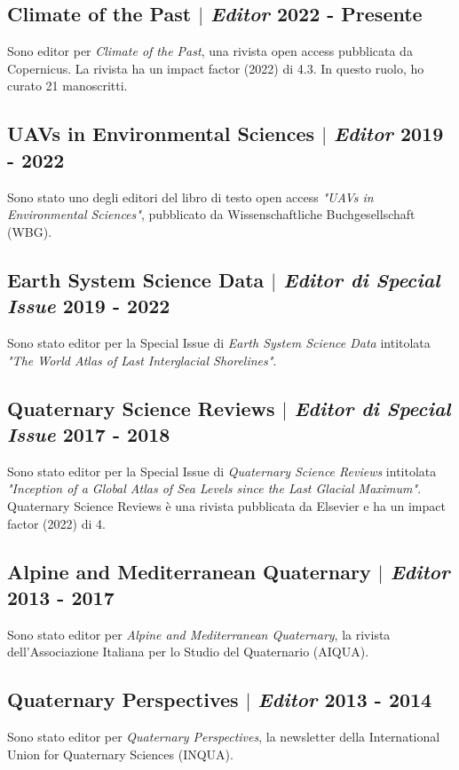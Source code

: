 \documentclass[11pt]{article}
\begin{document}
\subsection{Climate of the Past $|$ {\normalfont\textit{Editor}} \hfill 2022 - Presente}
{\footnotesize Sono editor per \textit{Climate of the Past}, una rivista open access pubblicata da Copernicus. La rivista ha un impact factor (2022) di 4.3. In questo ruolo, ho curato 21 manoscritti.}
\bigskip

\subsection{UAVs in Environmental Sciences $|$ {\normalfont\textit{Editor}} \hfill 2019 - 2022}
{\footnotesize Sono stato uno degli editori del libro di testo open access \textit{"UAVs in Environmental Sciences"}, pubblicato da Wissenschaftliche Buchgesellschaft (WBG).}
\bigskip

\subsection{Earth System Science Data $|$ {\normalfont\textit{Editor di Special Issue}} \hfill 2019 - 2022}
{\footnotesize Sono stato editor per la Special Issue di \textit{Earth System Science Data} intitolata \textit{"The World Atlas of Last Interglacial Shorelines"}.}
\bigskip

\subsection{Quaternary Science Reviews $|$ {\normalfont\textit{Editor di Special Issue}} \hfill 2017 - 2018}
{\footnotesize Sono stato editor per la Special Issue di \textit{Quaternary Science Reviews} intitolata \textit{"Inception of a Global Atlas of Sea Levels since the Last Glacial Maximum"}. Quaternary Science Reviews è una rivista pubblicata da Elsevier e ha un impact factor (2022) di 4.}
\bigskip

\subsection{Alpine and Mediterranean Quaternary $|$ {\normalfont\textit{Editor}} \hfill 2013 - 2017}
{\footnotesize Sono stato editor per \textit{Alpine and Mediterranean Quaternary}, la rivista dell'Associazione Italiana per lo Studio del Quaternario (AIQUA).}
\bigskip

\subsection{Quaternary Perspectives $|$ {\normalfont\textit{Editor}} \hfill 2013 - 2014}
{\footnotesize Sono stato editor per \textit{Quaternary Perspectives}, la newsletter della International Union for Quaternary Sciences (INQUA).}
\end{document}
